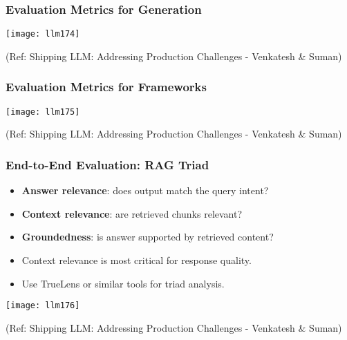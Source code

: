 \begin{frame}[fragile]\frametitle{Evaluation Metrics for Generation}

	\begin{center}
	\texttt{[image: llm174]}
	
	{\tiny (Ref: Shipping LLM: Addressing Production Challenges - Venkatesh \& Suman)}
	\end{center}   
\end{frame}

\begin{frame}[fragile]\frametitle{Evaluation Metrics for Frameworks}

	\begin{center}
	\texttt{[image: llm175]}
	
	{\tiny (Ref: Shipping LLM: Addressing Production Challenges - Venkatesh \& Suman)}
	\end{center}   
\end{frame}

\begin{frame}[fragile]\frametitle{End-to-End Evaluation: RAG Triad}
  \begin{itemize}
    \item \textbf{Answer relevance}: does output match the query intent?
    \item \textbf{Context relevance}: are retrieved chunks relevant?
    \item \textbf{Groundedness}: is answer supported by retrieved content?
    \item Context relevance is most critical for response quality.
    \item Use TrueLens or similar tools for triad analysis.
  \end{itemize}
  
	\begin{center}
	\texttt{[image: llm176]}
	
	{\tiny (Ref: Shipping LLM: Addressing Production Challenges - Venkatesh \& Suman)}
	\end{center}     
\end{frame}

